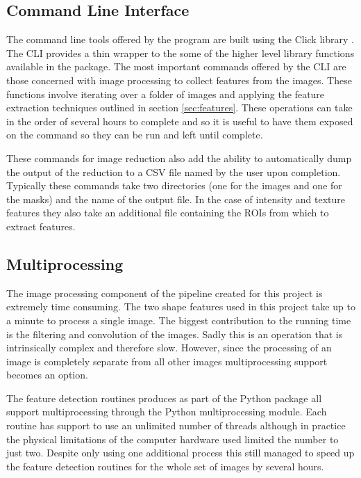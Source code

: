 \subsection{Command Line Interface}
The command line tools offered by the program are built using the Click library \cite{clickLibrary}. The CLI provides a thin wrapper to the some of the higher level library functions available in the package. The most important commands offered by the CLI are those concerned with image processing to collect features from the images. These functions involve iterating over a folder of images and applying the feature extraction techniques outlined in section  \ref{sec:features}. These operations can take in the order of several hours to complete and so it is useful to have them exposed on the command so they can be run and left until complete. 

These commands for image reduction also add the ability to automatically dump the output of the reduction to a CSV file named by the user upon completion. Typically these commands take two directories (one for the images and one for the masks) and the name of the output file. In the case of intensity and texture features they also take an additional file containing the ROIs from which to extract features.

\subsection{Multiprocessing}
\label{subsec:multiprocessing}
The image processing component of the pipeline created for this project is extremely time consuming. The two shape features used in this project take up to a minute to process a single image. The biggest contribution to the running time is the filtering and convolution of the images. Sadly this is an operation that is intrinsically complex and therefore slow. However, since the processing of an image is completely separate from all other images multiprocessing support becomes an option. 

The feature detection routines produces as part of the Python package all support multiprocessing through the Python multiprocessing module. Each routine has support to use an unlimited number of threads although in practice the physical limitations of the computer hardware used limited the number to just two. Despite only using one additional process this still managed to speed up the feature detection routines for the whole set of images by several hours.



